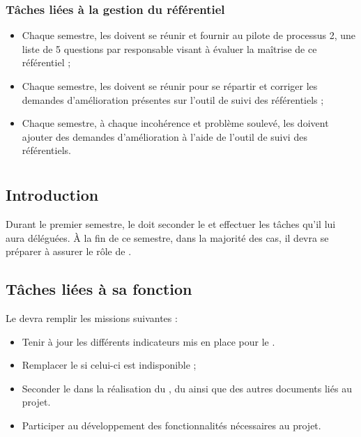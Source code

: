 \subsubsection*{Tâches liées à la gestion du référentiel}

\begin{itemize}
	\item Chaque semestre, les \RQs doivent se réunir et fournir au pilote de processus 2, une liste de 5 questions par responsable visant à évaluer la maîtrise de ce référentiel ;
	\item Chaque semestre, les \RQs doivent se réunir pour se répartir et corriger les demandes d’amélioration présentes sur l’outil de suivi des référentiels ;
	\item Chaque semestre, à chaque incohérence et problème soulevé, les \RQs doivent ajouter des demandes d’amélioration à l’aide de l’outil de suivi des référentiels.
\end{itemize}

\newpage
\section{\RQA}
\subsection*{Introduction}

Durant le premier semestre, le \RQA{} doit seconder le \RQ{} et effectuer les tâches qu’il lui aura déléguées. À la fin de ce semestre, dans la majorité des cas, il devra se préparer à assurer le rôle de \RQ .

\subsection*{Tâches liées à sa fonction}

Le \RQA devra remplir les missions suivantes :
\begin{itemize}
	\item Tenir à jour les différents indicateurs mis en place pour le \PICCourt.
	\item Remplacer le \RQA{} si celui-ci est indisponible ;
	\item Seconder le \RQ{} dans la réalisation du \PQ, du \PGC{} ainsi que des autres documents liés au projet.
        \item Participer au développement des fonctionnalités nécessaires au projet. 
\end{itemize}


